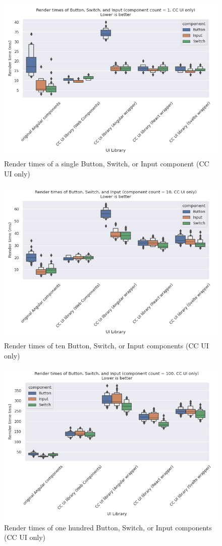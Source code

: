 \begin{figure}[htbp]
  \centering{}
  \includegraphics[width=0.8\columnwidth]{plots/render-time-cow-1.png}
  \caption{Render times of a single Button, Switch, or Input component (CC UI only)}
  \label{fig:results:render-time-cow-1}
  \centering
\end{figure}

\begin{figure}[htbp]
  \centering{}
  \includegraphics[width=0.8\columnwidth]{plots/render-time-cow-10.png}
  \caption{Render times of ten Button, Switch, or Input components (CC UI only)}
  \label{fig:results:render-time-cow-10}
  \centering
\end{figure}

\begin{figure}[htbp]
  \centering{}
  \includegraphics[width=0.8\columnwidth]{plots/render-time-cow-100.png}
  \caption{Render times of one hundred Button, Switch, or Input components (CC UI only)}
  \label{fig:results:render-time-cow-100}
  \centering
\end{figure}

